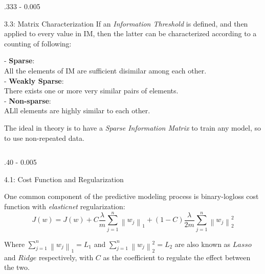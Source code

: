 \documentclass{postertheme}\usepackage[]{graphicx}\usepackage[]{color}
\begin{document}
\begin{frame}
\begin{columns}[onlytextwidth]
\begin{column}{.333 \textwidth - 0.005 \textwidth}
\begin{block}{3.3: Matrix Characterization }
        If an \textit{Information Threshold} is defined, and then applied to every value in IM, then the
        latter can be characterized according to a counting of following:
        
        - \textbf{Sparse}: \\ 
            All the elements of IM are sufficient disimilar among each other. \\
        - \textbf{Weakly Sparse}: \\
            There exists one or more very similar pairs of elements. \\
        - \textbf{Non-sparse}: \\
            ALll elements are highly similar to each other.
          
          The ideal in theory is to have a \textit{Sparse Information Matrix} to train any model, so to use
          non-repeated data.

    \end{block}
  \end{column}
  
  
\end{columns}


\begin{columns}[onlytextwidth]
  
  \begin{column}{.40 \textwidth - 0.005 \textwidth}
    \begin{block}{4.1: Cost Function and Regularization} \footnotesize
        
      One common component of the predictive modeling process is binary-logloss cost function 
      with \textit{elasticnet} regularization:
      \begin{equation*}
          J(w) =  J(w) + C \frac{\lambda}{m} \sum_{j=1}^n \left \lVert w_j \right\rVert_1 + (1 - C)
          \frac{\lambda}{2m} \sum_{j=1}^n \left \lVert w_j \right\rVert_2^2
      \end{equation*}
      
      Where $\sum_{j=1}^n \left \lVert w_j \right\rVert_1=L_{1}$ and 
      $\sum_{j=1}^n \left \lVert w_j \right\rVert_2^2=L_{2}$ are also known as $Lasso$ and $Ridge$
      respectively, with $C$ as the coefficient to regulate the effect between the two.
        

\end{block}
\end{column}
\end{columns}
\end{frame}
\end{document}
